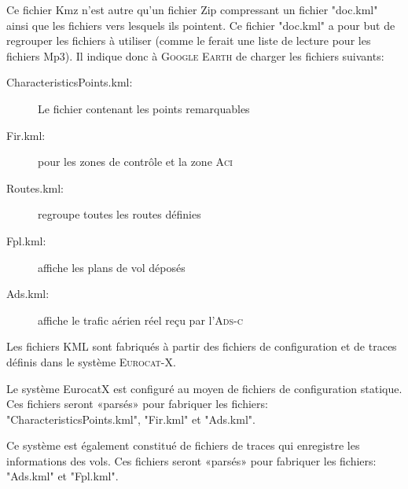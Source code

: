 Ce fichier Kmz n'est autre qu'un fichier Zip compressant un fichier "doc.kml" ainsi que les fichiers vers lesquels ils pointent. Ce fichier "doc.kml" a pour but de regrouper les fichiers à utiliser (comme le ferait une liste de lecture pour les fichiers Mp3). Il indique donc à \textsc{Google Earth} de charger les fichiers suivants:
\begin{description}
\item[CharacteristicsPoints.kml:] Le fichier contenant les points remarquables
\item[Fir.kml:] pour les zones de contrôle et la zone \textsc{Aci} 
\item[Routes.kml:] regroupe toutes les routes définies
\item[Fpl.kml:] affiche les plans de vol déposés
\item[Ads.kml:] affiche le trafic aérien réel reçu par l'\textsc{Ads-c}
\end{description}\medskip

Les fichiers KML sont fabriqués à partir des fichiers de configuration et de traces définis dans le système \textsc{Eurocat-X}. 

Le système EurocatX est configuré au moyen de fichiers de configuration statique. Ces fichiers seront «parsés» pour fabriquer les fichiers: "CharacteristicsPoints.kml", "Fir.kml" et "Ads.kml".

Ce système est également constitué de fichiers de traces qui enregistre les informations des vols. Ces fichiers seront «parsés» pour fabriquer les fichiers: "Ads.kml" et "Fpl.kml".

